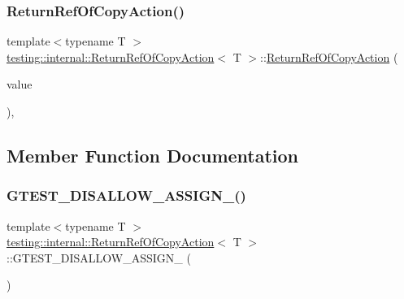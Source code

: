 \subsubsection{\texorpdfstring{ReturnRefOfCopyAction()}{ReturnRefOfCopyAction()}\hspace{0.1cm}{\footnotesize\ttfamily [3/3]}}
{\footnotesize\ttfamily template$<$typename T $>$ \\
\mbox{\hyperlink{classtesting_1_1internal_1_1_return_ref_of_copy_action}{testing\+::internal\+::\+Return\+Ref\+Of\+Copy\+Action}}$<$ T $>$\+::\mbox{\hyperlink{classtesting_1_1internal_1_1_return_ref_of_copy_action}{Return\+Ref\+Of\+Copy\+Action}} (\begin{DoxyParamCaption}\item[{const T \&}]{value }\end{DoxyParamCaption})\hspace{0.3cm}{\ttfamily [inline]}, {\ttfamily [explicit]}}



\subsection{Member Function Documentation}
\mbox{\label{classtesting_1_1internal_1_1_return_ref_of_copy_action_a767fa5d48c046e472eaf2353c2e7544c}} 
\subsubsection{\texorpdfstring{GTEST\_DISALLOW\_ASSIGN\_()}{GTEST\_DISALLOW\_ASSIGN\_()}\hspace{0.1cm}{\footnotesize\ttfamily [1/3]}}
{\footnotesize\ttfamily template$<$typename T $>$ \\
\mbox{\hyperlink{classtesting_1_1internal_1_1_return_ref_of_copy_action}{testing\+::internal\+::\+Return\+Ref\+Of\+Copy\+Action}}$<$ T $>$\+::G\+T\+E\+S\+T\+\_\+\+D\+I\+S\+A\+L\+L\+O\+W\+\_\+\+A\+S\+S\+I\+G\+N\+\_\+ (\begin{DoxyParamCaption}\item[{\mbox{\hyperlink{classtesting_1_1internal_1_1_return_ref_of_copy_action}{Return\+Ref\+Of\+Copy\+Action}}$<$ T $>$}]{ }\end{DoxyParamCaption})\hspace{0.3cm}{\ttfamily [private]}}

